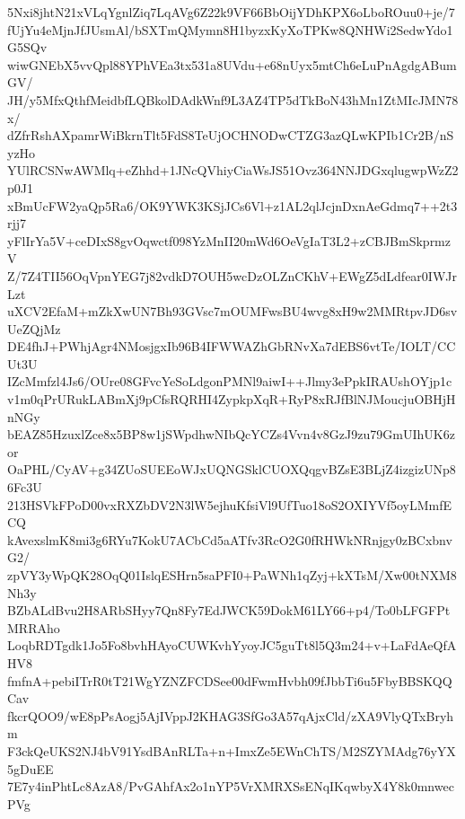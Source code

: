 5Nxi8jhtN21xVLqYgnlZiq7LqAVg6Z22k9VF66BbOijYDhKPX6oLboROuu0+je/7
fUjYu4eMjnJfJUsmAl/bSXTmQMymn8H1byzxKyXoTPKw8QNHWi2SedwYdo1G5SQv
wiwGNEbX5vvQpl88YPhVEa3tx531a8UVdu+e68nUyx5mtCh6eLuPnAgdgABumGV/
JH/y5MfxQthfMeidbfLQBkolDAdkWnf9L3AZ4TP5dTkBoN43hMn1ZtMIcJMN78x/
dZfrRshAXpamrWiBkrnTlt5FdS8TeUjOCHNODwCTZG3azQLwKPIb1Cr2B/nSyzHo
YUlRCSNwAWMlq+eZhhd+1JNcQVhiyCiaWsJS51Ovz364NNJDGxqlugwpWzZ2p0J1
xBmUcFW2yaQp5Ra6/OK9YWK3KSjJCs6Vl+z1AL2qlJcjnDxnAeGdmq7++2t3rjj7
yFlIrYa5V+ceDIxS8gvOqwctf098YzMnII20mWd6OeVgIaT3L2+zCBJBmSkprmzV
Z/7Z4TII56OqVpnYEG7j82vdkD7OUH5wcDzOLZnCKhV+EWgZ5dLdfear0IWJrLzt
uXCV2EfaM+mZkXwUN7Bh93GVsc7mOUMFwsBU4wvg8xH9w2MMRtpvJD6svUeZQjMz
DE4fhJ+PWhjAgr4NMosjgxIb96B4IFWWAZhGbRNvXa7dEBS6vtTe/IOLT/CCUt3U
IZcMmfzl4Js6/OUre08GFvcYeSoLdgonPMNl9aiwI++Jlmy3ePpkIRAUshOYjp1c
v1m0qPrURukLABmXj9pCfsRQRHI4ZypkpXqR+RyP8xRJfBlNJMoucjuOBHjHnNGy
bEAZ85HzuxlZce8x5BP8w1jSWpdhwNIbQcYCZs4Vvn4v8GzJ9zu79GmUIhUK6zor
OaPHL/CyAV+g34ZUoSUEEoWJxUQNGSklCUOXQqgvBZsE3BLjZ4izgizUNp86Fc3U
213HSVkFPoD00vxRXZbDV2N3lW5ejhuKfsiVl9UfTuo18oS2OXIYVf5oyLMmfECQ
kAvexslmK8mi3g6RYu7KokU7ACbCd5aATfv3RcO2G0fRHWkNRnjgy0zBCxbnvG2/
zpVY3yWpQK28OqQ01IslqESHrn5saPFI0+PaWNh1qZyj+kXTsM/Xw00tNXM8Nh3y
BZbALdBvu2H8ARbSHyy7Qn8Fy7EdJWCK59DokM61LY66+p4/To0bLFGFPtMRRAho
LoqbRDTgdk1Jo5Fo8bvhHAyoCUWKvhYyoyJC5guTt8l5Q3m24+v+LaFdAeQfAHV8
fmfnA+pebiITrR0tT21WgYZNZFCDSee00dFwmHvbh09fJbbTi6u5FbyBBSKQQCav
fkcrQOO9/wE8pPsAogj5AjIVppJ2KHAG3SfGo3A57qAjxCld/zXA9VlyQTxBryhm
F3ckQeUKS2NJ4bV91YsdBAnRLTa+n+ImxZe5EWnChTS/M2SZYMAdg76yYX5gDuEE
7E7y4inPhtLc8AzA8/PvGAhfAx2o1nYP5VrXMRXSsENqIKqwbyX4Y8k0mnwecPVg
